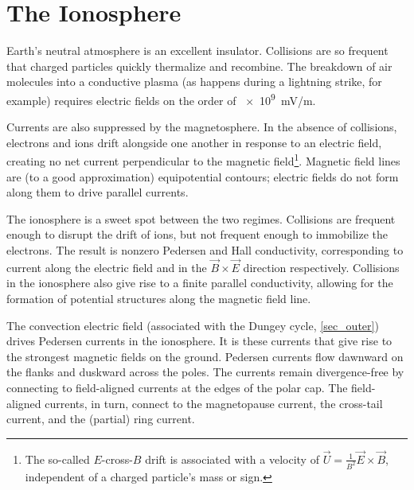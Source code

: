 \section{The Ionosphere}
  \label{sec_ionos}

Earth's neutral atmosphere is an excellent insulator. Collisions are so frequent that charged particles quickly thermalize and recombine. The breakdown of air molecules into a conductive plasma (as happens during a lightning strike, for example) requires electric fields on the order of \SI{e9}{\mV/\m}. 

Currents are also suppressed by the magnetosphere. In the absence of collisions, electrons and ions drift alongside one another in response to an electric field, creating no net current perpendicular to the magnetic field\footnote{The so-called $E$-cross-$B$ drift is associated with a velocity of $\vec{U} = \frac{1}{B^2} \vec{E} \times \vec{B}$, independent of a charged particle's mass or sign. }. Magnetic field lines are (to a good approximation) equipotential contours; electric fields do not form along them to drive parallel currents. 

The ionosphere is a sweet spot between the two regimes. Collisions are frequent enough to disrupt the drift of ions, but not frequent enough to immobilize the electrons. The result is nonzero Pedersen and Hall conductivity, corresponding to current along the electric field and in the $\vec{B} \times \vec{E}$ direction respectively. Collisions in the ionosphere also give rise to a finite parallel conductivity, allowing for the formation of potential structures along the magnetic field line. 


The convection electric field (associated with the Dungey cycle, \cref{sec_outer}) drives Pedersen currents in the ionosphere. It is these currents that give rise to the strongest magnetic fields on the ground. Pedersen currents flow dawnward on the flanks and duskward across the poles. The currents remain divergence-free by connecting to field-aligned currents at the edges of the polar cap. The field-aligned currents, in turn, connect to the magnetopause current, the cross-tail current, and the (partial) ring current. 

